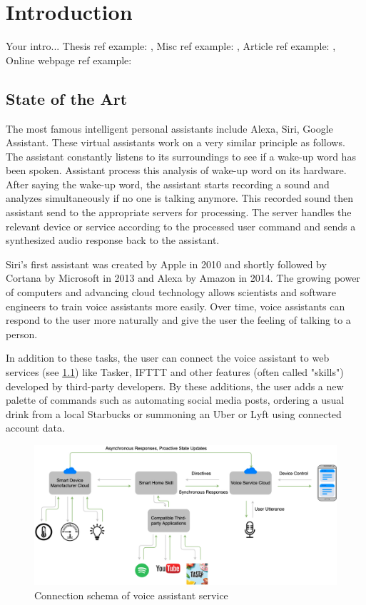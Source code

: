 \chapter{Introduction} \label{chap:introduction}
Your intro... Thesis ref example: \cite{bulin:2016}, Misc ref example: \cite{smidl:pc}, Article ref example: \cite{mcculloch:neuron}, Online webpage ref example: \cite{online:xor_solution}

\section{State of the Art} \label{sec:state_of_the_art}


The most famous intelligent personal assistants include Alexa, Siri, Google Assistant. These virtual assistants work on a very similar principle as follows. The assistant constantly listens to its surroundings to see if a wake-up word has been spoken. Assistant process this analysis of wake-up word on its hardware. After saying the wake-up word, the assistant starts recording a sound and analyzes simultaneously if no one is talking anymore. This recorded sound then assistant send to the appropriate servers for processing. The server handles the relevant device or service according to the processed user command and sends a synthesized audio response back to the assistant.

Siri's first assistant was created by Apple in 2010 and shortly followed by Cortana by Microsoft in 2013 and Alexa by Amazon in 2014. The growing power of computers and advancing cloud technology allows scientists and software engineers to train voice assistants more easily. Over time, voice assistants can respond to the user more naturally and give the user the feeling of talking to a person. 

In addition to these tasks, the user can connect the voice assistant to web services (see \cref{fig:voice_assistant_connecrtion_schema}) like Tasker, IFTTT and other features (often called "skills") developed by third-party developers. By these additions, the user adds a new palette of commands such as automating social media posts, ordering a usual drink from a local Starbucks or summoning an Uber or Lyft using connected account data.

\begin{figure}[H]
    \centering
    \includegraphics[width=\textwidth]{img/voice_assistant_to_server_connection.png}
    \caption{Connection schema of voice assistant service}
    \label{fig:voice_assistant_connecrtion_schema}
\end{figure}

